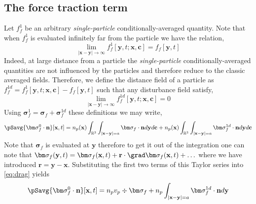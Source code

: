 


\subsection{The force traction term}

Let $f^1_f$ be an arbitrary \textit{single-particle} conditionally-averaged quantity. 
Note that when $f^1_f$ is evaluated infinitely far from the particle we have the relation, 
\begin{equation*}
    \lim_{|\textbf{x} - \textbf{y}| \to \infty}  f^1_f [\textbf{y},t;\textbf{x},\textbf{c}] = f_f [\textbf{y},t]
\end{equation*}
Indeed, at large distance from a particle the \textit{single-particle} conditionally-averaged quantities are not influenced by the particles and therefore reduce to the classic averaged fields. 
Therefore, we define the distance field of a particle as $f^{1d}_f = f^1_f [\textbf{y},t;\textbf{x},\textbf{c}]  - f_f[\textbf{y},t]$ such that any disturbance field satisfy, 
\begin{equation*}
    \lim_{|\textbf{x} - \textbf{y}| \to \infty}  f^{1d}_f [\textbf{y},t;\textbf{x},\textbf{c}] = 0 
\end{equation*}
Using  $\bm\sigma_f^1 = \bm\sigma_f + \bm\sigma_f^{1d}$ these definitions we may write, 
\begin{equation}
    \pSavg{\bm\sigma_f^0\cdot\textbf{n}}[\textbf{x},t]
    =
    n_p(\textbf{x})
    \int_{\mathbb{R}^3}
    \int_{|\textbf{x}-\textbf{y}|=a}
    \bm\sigma_f
    \cdot \textbf{n}
    d\textbf{y}
    d\textbf{c}
    + n_p(\textbf{x})
    \int_{\mathbb{R}^3}
    \int_{|\textbf{x}-\textbf{y}|=a}
    \bm\sigma_f^{1d}
    \cdot \textbf{n}
    d\textbf{y}
    d\textbf{c}
    \label{eq:drag}
\end{equation}
Note that $\bm\sigma_f$ is evaluated at $\textbf{y}$ therefore to get it out of the integration one can note that $\bm\sigma_f(\textbf{y},t) = \bm\sigma_f(\textbf{x},t) + \textbf{r}\cdot \grad\bm\sigma_f(\textbf{x},t)+ \ldots$
where we have introduced $\textbf{r} = \textbf{y} - \textbf{x}$. 
Substituting the first two terms of this Taylor series into \ref{eq:drag} yields
\begin{equation}
    \pSavg{\bm\sigma_f^0\cdot\textbf{n}}[\textbf{x},t]
    =
    n_p v_p 
    \div\bm\sigma_f
    +
    n_p 
    \int_{|\textbf{x}-\textbf{y}|=a}
    \bm\sigma_f^{1d} \cdot \textbf{n}
    d\textbf{y}
    \label{eq:drag_final}
\end{equation}
